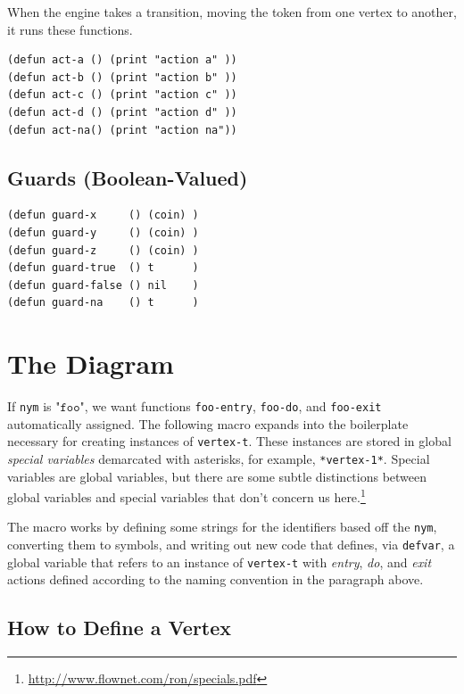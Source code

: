 \documentclass[10pt,oneside,x11names]{article}
\begin{document}
When the engine takes a transition, moving the token from one vertex to
another, it runs these functions.

\begin{verbatim}
(defun act-a () (print "action a" ))
(defun act-b () (print "action b" ))
(defun act-c () (print "action c" ))
(defun act-d () (print "action d" ))
(defun act-na() (print "action na"))
\end{verbatim}

\subsection{Guards (Boolean-Valued)}
\label{sec:org7e03781}

\begin{verbatim}
(defun guard-x     () (coin) )
(defun guard-y     () (coin) )
(defun guard-z     () (coin) )
(defun guard-true  () t      )
(defun guard-false () nil    )
(defun guard-na    () t      )
\end{verbatim}

\section{The Diagram}
\label{sec:orgd0f436b}

If \texttt{nym} is \(\texttt{"foo"}\), we want functions \texttt{foo-entry}, \texttt{foo-do}, and
\texttt{foo-exit} automatically assigned. The following macro expands into the
boilerplate necessary for creating instances of \texttt{vertex-t}. These instances
are stored in global \emph{special variables} demarcated with asterisks, for
example, \texttt{*vertex-1*}. Special variables are global variables, but there are
some subtle distinctions between global variables and special variables that
don't concern us here.\footnote{\url{http://www.flownet.com/ron/specials.pdf}}

The macro works by defining some strings for the identifiers based off the
\texttt{nym}, converting them to symbols, and writing out new code that defines,
via \texttt{defvar}, a global variable that refers to an instance of \texttt{vertex-t}
with \emph{entry}, \emph{do}, and \emph{exit} actions defined according to the naming
convention in the paragraph above.

\subsection{How to Define a Vertex}
\label{sec:org335338c}
\end{document}
